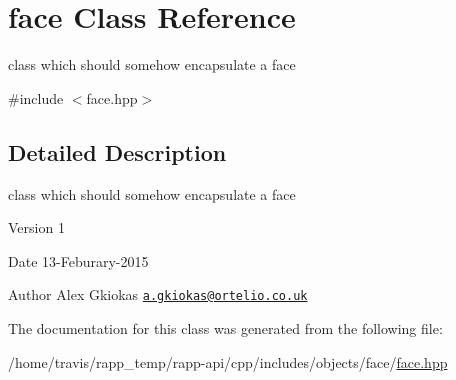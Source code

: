 \hypertarget{classface}{\section{face Class Reference}
\label{classface}
}


class which should somehow encapsulate a face  




{\ttfamily \#include $<$face.\-hpp$>$}



\subsection{Detailed Description}
class which should somehow encapsulate a face 

\begin{DoxyVersion}{Version}
1 
\end{DoxyVersion}
\begin{DoxyDate}{Date}
13-\/\-Feburary-\/2015 
\end{DoxyDate}
\begin{DoxyAuthor}{Author}
Alex Gkiokas \href{mailto:a.gkiokas@ortelio.co.uk}{\tt a.\-gkiokas@ortelio.\-co.\-uk} 
\end{DoxyAuthor}


The documentation for this class was generated from the following file\-:\begin{DoxyCompactItemize}
\item 
/home/travis/rapp\-\_\-temp/rapp-\/api/cpp/includes/objects/face/\hyperlink{face_8hpp}{face.\-hpp}\end{DoxyCompactItemize}
